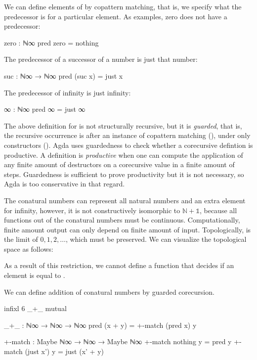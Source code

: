 We can define elements of  by copattern matching, that is, we
specify what the predecessor is for a particular element. As examples, zero does
not have a predecessor:
\begin{code}
zero : ℕ∞
pred zero = nothing
\end{code}
The predecessor of a successor of a number is just that number:
\begin{code}
suc : ℕ∞ → ℕ∞
pred (suc x) = just x
\end{code}
The predecessor of infinity is just infinity:
\begin{code}
∞ : ℕ∞
pred ∞ = just ∞
\end{code}
The above definition for  is not structurally recursive, but it
is \emph{guarded}, that is, the recursive occurrence is after an instance of
copattern matching (), under only constructors
(). Agda uses guardedness to check whether a
corecursive defintion is productive. A definition is \emph{productive} when one
can compute the application of any finite amount of destructors on a corecursive
value in a finite amount of steps. Guardedness is sufficient to prove
productivity but it is not necessary, so Agda is too conservative in that
regard.

The conatural numbers can represent all natural numbers and an extra element for
infinity, however, it is not constructively isomorphic to $\mathbb{N} +
\mathbb{1}$, because all functions out of the conatural numbers must be
continuous. Computationally, finite amount output can only depend on finite
amount of input. Topologically,  is the limit of $0, 1, 2,
\dots$, which must be preserved. We can visualize the topological space as
follows:
\begin{center}
\end{center}
As a result of this restriction, we cannot define a function that decides if an
element is equal to .

We can define addition of conatural numbers by guarded corecursion.
\begin{code}[hide]
infixl 6 _+_
mutual
\end{code}
\begin{code}
  _+_ : ℕ∞ → ℕ∞ → ℕ∞
  pred (x + y) = +-match (pred x) y

  +-match : Maybe ℕ∞ → ℕ∞ → Maybe ℕ∞
  +-match nothing    y = pred y
  +-match (just x')  y = just (x' + y)
\end{code}


